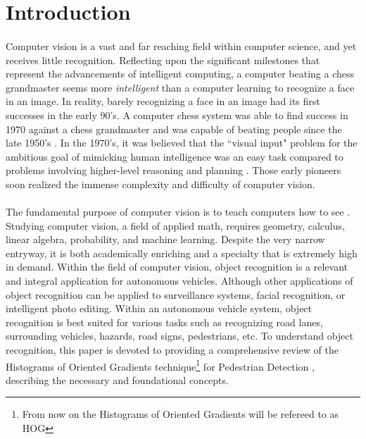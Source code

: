 \documentclass[11pt]{article}
\newcommand\simpleparagraph[1]{%
	\stepcounter{paragraph}\paragraph*{\theparagraph\quad{}#1}}
\renewcommand\theparagraph{}
\begin{document}
\section{Introduction} %
\simpleparagraph{}
Computer vision is a vast and far reaching field within computer science, and yet receives little recognition. Reflecting upon the significant milestones that represent the advancements of intelligent computing, a computer beating a chess grandmaster seems more \textit{intelligent} than a computer learning to recognize a face in an image. In reality, barely recognizing a face in an image had its first successes in the early 90's. A computer chess system was able to find success in 1970 against a chess grandmaster and was capable of beating people since the late 1950's \cite{contributors_computer_2018}. In the 1970's, it was believed that the ``visual input" problem for the ambitious goal of mimicking human intelligence was an easy task compared to problems involving higher-level reasoning and planning \cite{szeliski_computer_2011}. Those early pioneers soon realized the immense complexity and difficulty of computer vision.
\simpleparagraph{}
The  fundamental purpose of computer vision is to teach computers how to see \cite{nat_36_2017}\cite{malik_three_2016}. Studying computer vision, a field of applied math, requires geometry, calculus, linear algebra, probability, and machine learning. Despite the very narrow entryway, it is both academically enriching and a specialty that is extremely high in demand. Within the field of computer vision, object recognition is a relevant and integral application for autonomous vehicles. Although other applications of object recognition can be applied to surveillance systems, facial recognition, or intelligent photo editing. Within an autonomous vehicle system, object recognition is best suited for various tasks such as recognizing road lanes, surrounding vehicles, hazards, road signs, pedestrians, etc. To understand object recognition, this paper is devoted to providing a comprehensive review of the Histograms of Oriented Gradients technique\footnote{From now on the Histograms of Oriented Gradients will be refereed to as HOG} for Pedestrian Detection \cite{dalal_histograms_2005}, describing the necessary and foundational concepts.
\end{document}
